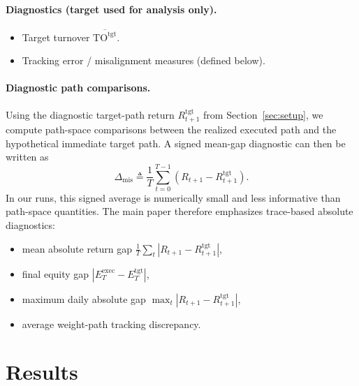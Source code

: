 \documentclass[10pt,twocolumn]{article}
\newcommand{\TOtgt}{\mathrm{TO}^{\mathrm{tgt}}}
\begin{document}
\paragraph{Diagnostics (target used for analysis only).}
\begin{itemize}[leftmargin=*,itemsep=1pt]
\item Target turnover $\overline{\TOtgt}$.
\item Tracking error / misalignment measures (defined below).
\end{itemize}

\paragraph{Diagnostic path comparisons.}
Using the diagnostic target-path return $R^{\mathrm{tgt}}_{t+1}$ from Section~\ref{sec:setup}, we compute path-space comparisons between the realized executed path and the hypothetical immediate target path. A signed mean-gap diagnostic can then be written as
\[
\Delta_{\mathrm{mis}} \triangleq \frac{1}{T}\sum_{t=0}^{T-1}\left(R_{t+1} - R^{\mathrm{tgt}}_{t+1}\right).
\]
In our runs, this signed average is numerically small and less informative than path-space quantities. The main paper therefore emphasizes trace-based absolute diagnostics:
\begin{itemize}[leftmargin=*,itemsep=1pt]
\item mean absolute return gap $\frac{1}{T}\sum_t |R_{t+1}-R^{\mathrm{tgt}}_{t+1}|$,
\item final equity gap $|E_T^{\mathrm{exec}}-E_T^{\mathrm{tgt}}|$,
\item maximum daily absolute gap $\max_t |R_{t+1}-R^{\mathrm{tgt}}_{t+1}|$,
\item average weight-path tracking discrepancy.
\end{itemize}

\section{Results}
\label{sec:results}
\end{document}

